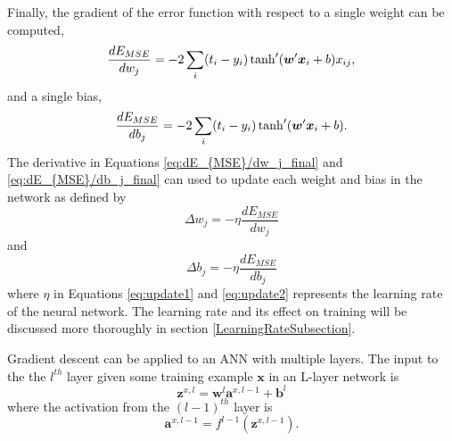 %
Finally, the gradient of the error function with respect to a single weight can be computed, 
%
\begin{equation} \label{eq:dE_{MSE}/dw_j_final}
\frac{dE_{MSE}}{dw_j} =  -2 \sum_i  (t_i - y_i) \tanh'( \boldsymbol{w}' \boldsymbol{x}_i + b)  x_{ij},
\end{equation}
%
and a single bias,
%
\begin{equation} \label{eq:dE_{MSE}/db_j_final}
\frac{dE_{MSE}}{db_j} =  -2 \sum_i  (t_i - y_i) \tanh'( \boldsymbol{w}' \boldsymbol{x}_i + b).
\end{equation}
%
The derivative in Equations \ref{eq:dE_{MSE}/dw_j_final} and \ref{eq:dE_{MSE}/db_j_final} can used to update each weight and bias in the network as defined by 
%
\begin{equation} \label{eq:update1}
\Delta w_{j} = - \eta \frac{dE_{MSE}}{dw_j}
\end{equation}
%
and 
%
\begin{equation} \label{eq:update2}
\Delta b_{j} = - \eta \frac{dE_{MSE}}{db_j}
\end{equation}
%
where $\eta$ in Equations \ref{eq:update1} and \ref{eq:update2} represents the learning rate of the neural network. The learning rate and its effect on training will be discussed more thoroughly in section \ref{LearningRateSubsection}.

Gradient descent can be applied to an ANN with multiple layers. The input to the the $l^{th}$ layer given some training example $\boldsymbol{x}$ in an L-layer network is 
\begin{equation} \label{eq:CrossEntropy}
\boldsymbol{z}^{x,l} = \boldsymbol{w}^{l}  \boldsymbol{a}^{x,l-1} + \boldsymbol{b}^{l}
\end{equation}
%
where the activation from the $(l-1)^{th}$ layer is
%
\begin{equation} \label{eq:CrossEntropy}
\boldsymbol{a}^{x,l-1} = f^{l-1}(\boldsymbol{z}^{x,l-1}).
\end{equation}

